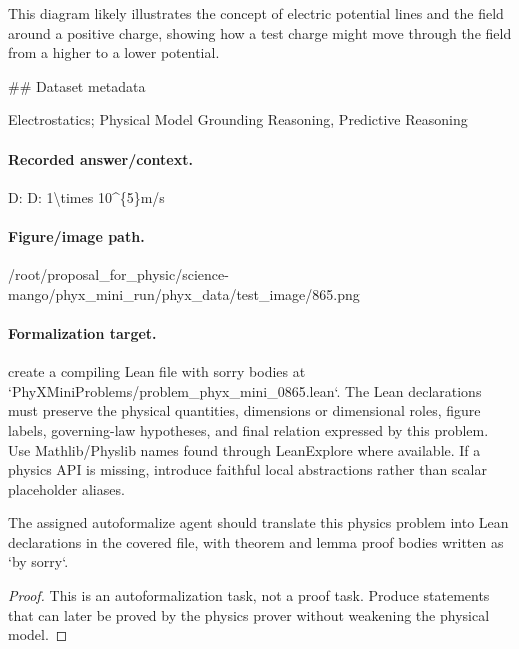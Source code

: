 This diagram likely illustrates the concept of electric potential lines and the field around a positive charge, showing how a test charge might move through the field from a higher to a lower potential.

\#\# Dataset metadata

Electrostatics; Physical Model Grounding Reasoning, Predictive Reasoning

\paragraph{Recorded answer/context.}
D: D: 1\textbackslash{}times 10\textasciicircum{}\{5\}m/s

\paragraph{Figure/image path.}
/root/proposal\_for\_physic/science-mango/phyx\_mini\_run/phyx\_data/test\_image/865.png

\paragraph{Formalization target.}
create a compiling Lean file with sorry bodies at `PhyXMiniProblems/problem\_phyx\_mini\_0865.lean`. The Lean declarations must preserve the physical quantities, dimensions or dimensional roles, figure labels, governing-law hypotheses, and final relation expressed by this problem.
Use Mathlib/Physlib names found through LeanExplore where available. If a physics API is missing, introduce faithful local abstractions rather than scalar placeholder aliases.

\begin{theorem}
\label{thm:physics:phyx_mini_0865:target}
The assigned autoformalize agent should translate this physics problem into Lean declarations in the covered file, with theorem and lemma proof bodies written as `by sorry`.
\end{theorem}
\begin{proof}
This is an autoformalization task, not a proof task. Produce statements that can later be proved by the physics prover without weakening the physical model.
\end{proof}

